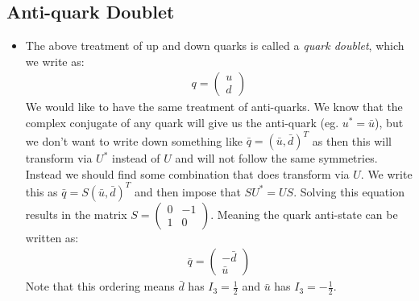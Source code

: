 \documentclass[11pt]{article}
\numberwithin{equation}{section}
\begin{document}
\subsection{Anti-quark Doublet} %
\label{sub:anti_quark_doublet}
\begin{itemize}
    \item The above treatment of up and down quarks is called a \emph{quark doublet}, which we write as:
    \begin{align*}
        q = \left(\begin{matrix}
            u \\ d
        \end{matrix}\right)
    \end{align*}
We would like to have the same treatment of anti-quarks. We know that the complex conjugate of any quark will give us the anti-quark (eg. $u^{\ast} = \bar{u}$), but we don't want to write down something like $\bar{q} = (\bar{u},\bar{d})^{T}$ as then this will transform via $U^{\ast}$ instead of $U$ and will not follow the same symmetries. Instead we should find some combination that does transform via $U$. We write this as $\bar{q} = S(\bar{u},\bar{d})^{T}$ and then impose that $SU^{\ast} = US$. Solving this equation results in the matrix $S= \begin{pmatrix}
    0 & -1 \\ 1 & 0 
\end{pmatrix}$. Meaning the quark anti-state can be written as:
\begin{align*}
    \bar{q} = \begin{pmatrix}
        -\bar{d} \\ \bar{u}
    \end{pmatrix}
\end{align*}
Note that this ordering means $\bar{d}$ has $I_3=\frac{1}{2}$ and $\bar{u}$ has $I_3=-\frac{1}{2}$.

\end{itemize}
\end{document}
